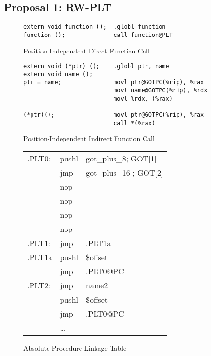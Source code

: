 

\subsection{Proposal 1: RW-PLT}


\begin{figure}[H]
\caption{Position-Independent Direct Function Call}
\begin{verbatim}
extern void function ();  .globl function
function ();              call function@PLT
\end{verbatim}
\end{figure}

\begin{figure}[H]
\caption{Position-Independent Indirect Function Call}
\begin{verbatim}
extern void (*ptr) ();    .globl ptr, name
extern void name ();
ptr = name;               movl ptr@GOTPC(%rip), %rax
                          movl name@GOTPC(%rip), %rdx
                          movl %rdx, (%rax)

(*ptr)();                 movl ptr@GOTPC(%rip), %rax
                          call *(%rax)
\end{verbatim}
\end{figure}

\begin{figure}[H]
\caption{Absolute Procedure Linkage Table}
\begin{tabular}{lll}
.PLT0: & pushl & got\_plus\_8; GOT[1]\\
& jmp &got\_plus\_16 ; GOT[2] \\
& nop & \\
& nop & \\
& nop & \\
& nop & \\
.PLT1: & jmp & .PLT1a \\
.PLT1a& pushl & \$offset \\
&jmp &.PLT0@PC \\
.PLT2: & jmp& name2\\
&pushl & \$offset \\
& jmp & .PLT0@PC \\
&\dots\\
\end{tabular}
\end{figure}


